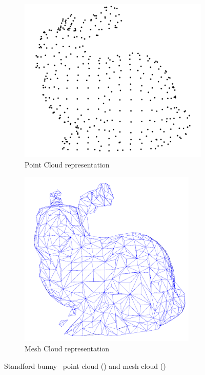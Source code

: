 \begin{figure}[H]
	\centering
	\begin{subfigure}[c]{0.45\textwidth}
	\includegraphics[width=\textwidth]{img/lidar/bunny_point.png}
		\caption{Point Cloud representation}
		\label{fig:bunnyPointCloud}
	\end{subfigure}
	\quad
	\begin{subfigure}[c]{0.4\textwidth}
		\includegraphics[width=\textwidth]{img/lidar/bunny_mesh.png}
		\caption{Mesh Cloud representation}
		\label{fig:bunnyMeshCloud}
	\end{subfigure}
	\caption{Standford bunny~\cite{bunny} point cloud () and mesh cloud ()}
	\label{fig:bunny}
\end{figure}



